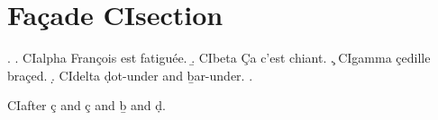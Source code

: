 
\usepackage{hyperref}


\section{Fa\c cade CIsection}
\label{sec:facade}

\ex. \a. CIalpha Fran\c cois est fatigu\'ee.
\b. CIbeta \c Ca c'est chiant.
\c. CIgamma \c{c}edille bra\c{c}ed.
\d. CIdelta \d{d}ot-under and \b{b}ar-under.
\z.

CIafter ç and \c{c} and \b{b} and \d{d}.

